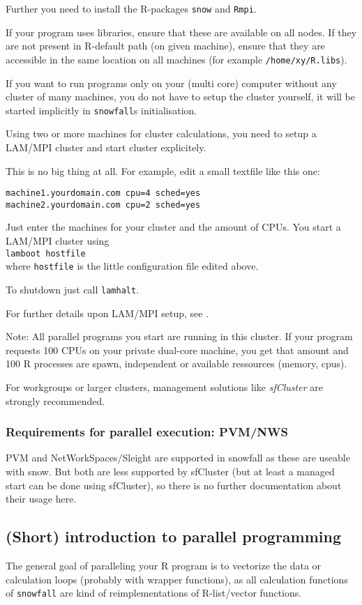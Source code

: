 \documentclass[10pt,oneside]{article}
\begin{document}
Further you need to install the R-packages \texttt{snow} and
\texttt{Rmpi}.

If your program uses libraries, ensure that these are available on all
nodes. If they are not present in R-default path (on given machine),
ensure that they are accessible in the same location on all machines
(for example \texttt{/home/xy/R.libs}).

If you want to run programs only on your (multi core) computer without
any cluster of many machines, you do not have to setup the cluster
yourself, it will be started implicitly in \texttt{snowfall}s initialisation.

Using two or more machines for cluster calculations, you need to setup
a LAM/MPI cluster and start cluster explicitely.

This is no big thing at all. For example, edit a small textfile like this
one:

\texttt{machine1.yourdomain.com cpu=4 sched=yes\\
machine2.yourdomain.com cpu=2 sched=yes}

Just enter the machines for your cluster and the amount of CPUs.
You start a LAM/MPI cluster using\\
\texttt{lamboot hostfile}\\
where \texttt{hostfile} is the little configuration file edited
above.

To shutdown just call \texttt{lamhalt}.

For further details upon LAM/MPI setup, see \cite{burns94:_lam}.

Note: All parallel programs you start are running in this cluster.
If your program requests 100 CPUs on your private dual-core machine,
you get that amount and 100 R processes are spawn, independent
or available ressources (memory, cpus).

For workgroups or larger clusters, management solutions like
\emph{sfCluster} are strongly recommended.

\subsubsection{Requirements for parallel execution: PVM/NWS}
PVM and NetWorkSpaces/Sleight are supported in snowfall as these
are useable with snow. But both are less supported by sfCluster
(but at least a managed start can be done using sfCluster), so
there is no further documentation about their usage here.

\subsection{(Short) introduction to parallel programming}
The general goal of paralleling your R program is to vectorize the data
or calculation loops (probably with wrapper functions), as all
calculation functions of \texttt{snowfall} are kind of reimplementations
of R-list/vector functions.
\end{document}
